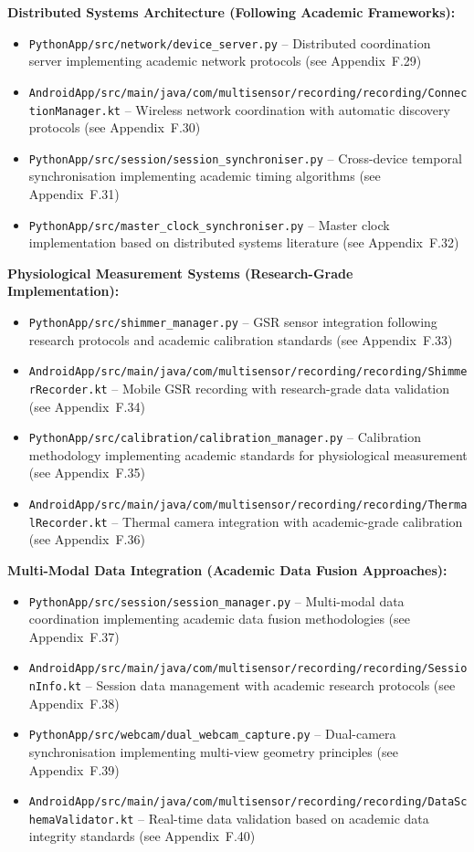 \documentclass[11pt,a4paper]{report}
\begin{document}
\noindent \textbf{Distributed Systems Architecture (Following Academic Frameworks):}\\
\begin{itemize}
\item \texttt{PythonApp/src/network/device\_server.py} – Distributed coordination server implementing academic network protocols (see Appendix~F.29)
\item \texttt{AndroidApp/src/main/java/com/multisensor/recording/recording/ConnectionManager.kt} – Wireless network coordination with automatic discovery protocols (see Appendix~F.30)
\item \texttt{PythonApp/src/session/session\_synchroniser.py} – Cross-device temporal synchronisation implementing academic timing algorithms (see Appendix~F.31)
\item \texttt{PythonApp/src/master\_clock\_synchroniser.py} – Master clock implementation based on distributed systems literature (see Appendix~F.32)
\end{itemize}

\noindent \textbf{Physiological Measurement Systems (Research-Grade Implementation):}\\
\begin{itemize}
\item \texttt{PythonApp/src/shimmer\_manager.py} – GSR sensor integration following research protocols and academic calibration standards (see Appendix~F.33)
\item \texttt{AndroidApp/src/main/java/com/multisensor/recording/recording/ShimmerRecorder.kt} – Mobile GSR recording with research-grade data validation (see Appendix~F.34)
\item \texttt{PythonApp/src/calibration/calibration\_manager.py} – Calibration methodology implementing academic standards for physiological measurement (see Appendix~F.35)
\item \texttt{AndroidApp/src/main/java/com/multisensor/recording/recording/ThermalRecorder.kt} – Thermal camera integration with academic-grade calibration (see Appendix~F.36)
\end{itemize}

\noindent \textbf{Multi-Modal Data Integration (Academic Data Fusion Approaches):}\\
\begin{itemize}
\item \texttt{PythonApp/src/session/session\_manager.py} – Multi-modal data coordination implementing academic data fusion methodologies (see Appendix~F.37)
\item \texttt{AndroidApp/src/main/java/com/multisensor/recording/recording/SessionInfo.kt} – Session data management with academic research protocols (see Appendix~F.38)
\item \texttt{PythonApp/src/webcam/dual\_webcam\_capture.py} – Dual-camera synchronisation implementing multi-view geometry principles (see Appendix~F.39)
\item \texttt{AndroidApp/src/main/java/com/multisensor/recording/recording/DataSchemaValidator.kt} – Real-time data validation based on academic data integrity standards (see Appendix~F.40)
\end{itemize}
\end{document}
